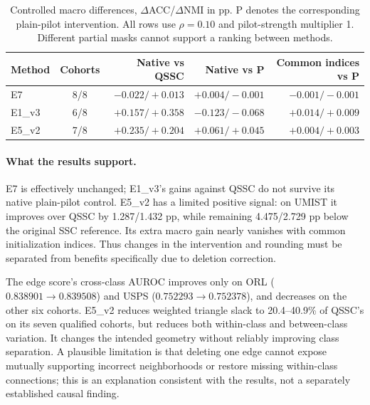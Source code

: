 {\begin{table}[!htbp]
\centering
\caption{Controlled macro differences, $\Delta$ACC/$\Delta$NMI in pp.
P denotes the corresponding plain-pilot intervention. All rows use
$\rho=0.10$ and pilot-strength multiplier 1. Different partial masks cannot
support a ranking between methods.}
\label{tab:extension_controls}
\small
\setlength{\tabcolsep}{4pt}
\begin{tabular}{@{}lcrrr@{}}
\toprule
Method & Cohorts & Native vs QSSC & Native vs P & Common indices vs P \\
\midrule
E7 & 8/8
 & $-0.022/+0.013$ & $+0.004/-0.001$ & $-0.001/-0.001$ \\
E1\_v3 & 6/8
 & $+0.157/+0.358$ & $-0.123/-0.068$ & $+0.014/+0.009$ \\
E5\_v2 & 7/8
 & $+0.235/+0.204$ & $+0.061/+0.045$ & $+0.004/+0.003$ \\
\bottomrule
\end{tabular}
\end{table}

\paragraph{What the results support.}
E7 is effectively unchanged; E1\_v3's gains against QSSC do not survive its
native plain-pilot control. E5\_v2 has a limited positive signal: on UMIST
it improves over QSSC by 1.287/1.432 pp, while remaining 4.475/2.729 pp below
the original SSC reference. Its extra macro gain nearly vanishes with common
initialization indices. Thus changes in the intervention and rounding must be
separated from benefits specifically due to deletion correction.

The edge score's cross-class AUROC improves only on ORL
($0.838901\to0.839508$) and USPS ($0.752293\to0.752378$), and decreases
on the other six cohorts. E5\_v2 reduces weighted triangle slack to
20.4--40.9\% of QSSC's on its seven qualified cohorts, but reduces both
within-class and between-class variation. It changes the intended geometry
without reliably improving class separation. A plausible limitation is that
deleting one edge cannot expose mutually supporting incorrect neighborhoods
or restore missing within-class connections; this is an explanation consistent
with the results, not a separately established causal finding.
}

